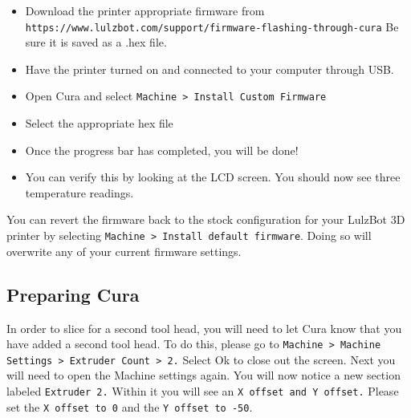 \begin{itemize}
\item Download the printer appropriate firmware from \texttt{https://www.lulzbot.com/support/firmware-flashing-through-cura} Be sure it is saved as a .hex file.
\item Have the printer turned on and connected to your computer through USB.
\item Open Cura and select \texttt{Machine > Install Custom Firmware}
\item Select the appropriate hex file
\item Once the progress bar has completed, you will be done!  
\item You can verify this by looking at the LCD screen. You should now see three temperature readings. 
\end{itemize} 
You can revert the firmware back to the stock configuration for your LulzBot\textsuperscript{\miniscule{\texttrademark}} 3D printer by selecting \texttt{Machine > Install default firmware}. Doing so will overwrite any of your current firmware settings.

\subsection{Preparing Cura}
In order to slice for a second tool head, you will need to let Cura know that you have added a second tool head. To do this, please go to \texttt{Machine > Machine Settings > Extruder Count > 2.} Select Ok to close out the screen. Next you will need to open the Machine settings again. You will now notice a new section labeled \texttt{Extruder 2.} Within it you will see an \texttt{X offset and Y offset.} Please set the \texttt{X offset to 0} and the \texttt{Y offset to -50}. 

